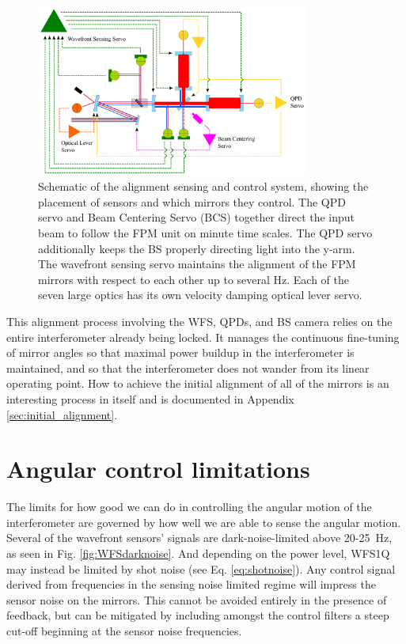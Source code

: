 \begin{figure} \begin{centering} \includegraphics[width=0.8\textwidth]{figures/ASClayout_wctrl.pdf} 
\caption[Schematic of the alignment sensing and control system]{Schematic of the alignment sensing and control system, showing the placement of sensors and which mirrors they control. The QPD servo and Beam Centering Servo (BCS) together direct the input beam to follow the FPM unit on minute time scales. The QPD servo additionally keeps the BS properly directing light into the y-arm. The wavefront sensing servo maintains the alignment of the FPM mirrors with respect to each other up to several Hz. Each of the seven large optics has its own velocity damping optical lever servo.}
\label{fig:ASClayout}
\end{centering}
\end{figure}

This alignment process involving the WFS, QPDs, and BS camera relies on the entire interferometer already being locked. It manages the continuous fine-tuning of mirror angles so that maximal power buildup in the interferometer is maintained, and so that the interferometer does not wander from its linear operating point. How to achieve the initial alignment of all of the mirrors is an interesting process in itself and is documented in Appendix \ref{sec:initial_alignment}.




\section{Angular control limitations}
\label{sec:ASClimits}
The limits for how good we can do in controlling the angular motion of the interferometer are governed by how well we are able to sense the angular motion. Several of the wavefront sensors' signals are dark-noise-limited above 20-25~Hz, as seen in Fig. \ref{fig:WFSdarknoise}. And depending on the power level, WFS1Q may instead be limited by shot noise (see Eq. \ref{eq:shotnoise}). Any control signal derived from frequencies in the sensing noise limited regime will impress the sensor noise on the mirrors. This cannot be avoided entirely in the presence of feedback, but can be mitigated by including amongst the control filters a steep cut-off beginning at the sensor noise frequencies. 

